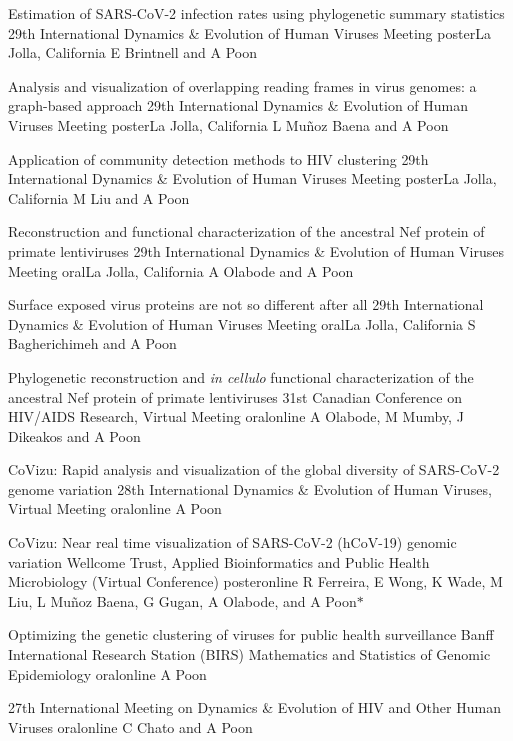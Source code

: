 {Estimation of SARS-CoV-2 infection rates using phylogenetic summary statistics}
{29th International Dynamics \& Evolution of Human Viruses Meeting}
{poster}{La Jolla, California}
{E Brintnell and A Poon}{}

{Analysis and visualization of overlapping reading frames in virus genomes: a graph-based approach}
{29th International Dynamics \& Evolution of Human Viruses Meeting}
{poster}{La Jolla, California}
{L Mu\~noz Baena and A Poon}{}

{Application of community detection methods to HIV clustering}
{29th International Dynamics \& Evolution of Human Viruses Meeting}
{poster}{La Jolla, California}
{M Liu and A Poon}{}

{Reconstruction and functional characterization of the ancestral Nef protein of primate lentiviruses}
{29th International Dynamics \& Evolution of Human Viruses Meeting}
{oral}{La Jolla, California}
{A Olabode and A Poon}{}

{Surface exposed virus proteins are not so different after all}
{29th International Dynamics \& Evolution of Human Viruses Meeting}
{oral}{La Jolla, California}
{S Bagherichimeh and A Poon}{}

{Phylogenetic reconstruction and \textit{in cellulo} functional characterization of the ancestral Nef protein of primate lentiviruses}
{31st Canadian Conference on HIV/AIDS Research, Virtual Meeting}
{oral}{online}
{A Olabode, M Mumby, J Dikeakos and A Poon}{}

{CoVizu: Rapid analysis and visualization of the global diversity of SARS-CoV-2 genome variation}
{28th International Dynamics \& Evolution of Human Viruses, Virtual Meeting}
{oral}{online}
{A Poon}{}

{CoVizu: Near real time visualization of SARS-CoV-2 (hCoV-19) genomic variation}
{Wellcome Trust, Applied Bioinformatics and Public Health Microbiology (Virtual Conference)}
{poster}{online}
{R Ferreira, E Wong, K Wade, M Liu, L Mu\~noz Baena, G Gugan, A Olabode, and A Poon$\ast$}{}

{Optimizing the genetic clustering of viruses for public health surveillance}
{Banff International Research Station (BIRS) Mathematics and Statistics of Genomic Epidemiology}
{oral}{online}
{A Poon}{}

{27th International Meeting on Dynamics \& Evolution of HIV and Other Human Viruses}
{oral}{online}
{C Chato and A Poon}{}

